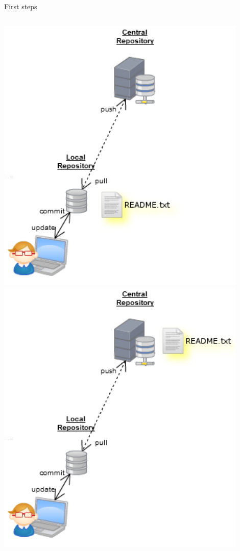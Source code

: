 \begin{frame}[fragile]{First steps}
\begin{columns}
\begin{column}{0.4\textwidth}
\begin{center}
{				}\only<3> {
					\includegraphics[width=0.9\textwidth]{commit.png}
				}\only<4> {
					\includegraphics[width=0.9\textwidth]{push.png}
				}
			\end{center}
		\end{column}
	\end{columns}
\end{frame}

